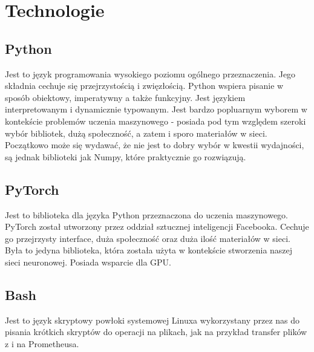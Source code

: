 \section{Technologie}

\subsection{Python}
Jest to język programowania wysokiego poziomu ogólnego przeznaczenia.
Jego składnia cechuje się przejrzystością i zwięzłością. Python wspiera pisanie w sposób obiektowy, 
imperatywny a także funkcyjny. Jest językiem interpretowanym i dynamicznie typowanym. Jest bardzo popluarnym 
wyborem w kontekście problemów uczenia maszynowego - posiada pod tym względem szeroki wybór bibliotek, 
dużą społeczność, a zatem i sporo materiałów w sieci.
Początkowo może się wydawać, że nie jest to dobry wybór w kwestii wydajności, 
są jednak biblioteki jak Numpy, które praktycznie go rozwiązują.

\subsection{PyTorch}
Jest to biblioteka dla języka Python przeznaczona do uczenia maszynowego. PyTorch został utworzony
przez oddział sztucznej inteligencji Facebooka. Cechuje go przejrzysty interface, duża społeczność
oraz duża ilość materiałów w sieci. Była to jedyna biblioteka, która została użyta w kontekście 
stworzenia naszej sieci neuronowej. Posiada wsparcie dla GPU.

\subsection{Bash}
Jest to język skryptowy powłoki systemowej Linuxa wykorzystany przez nas do pisania krótkich skryptów
do operacji na plikach, jak na przykład transfer plików z i na Prometheusa.
